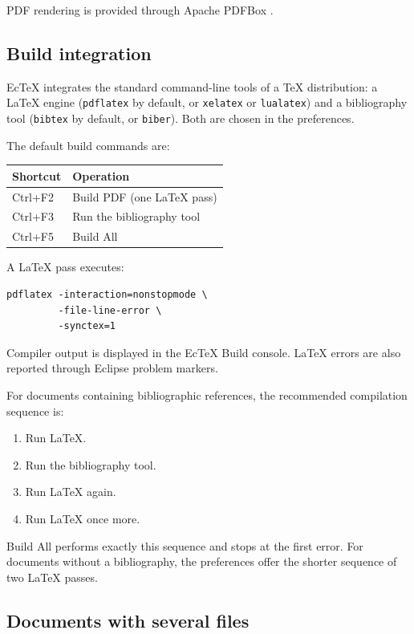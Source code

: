 PDF rendering is provided through Apache PDFBox
\cite{pdfbox}.

\subsection{Build integration}

EcTeX integrates the standard command-line tools of a TeX
distribution: a LaTeX engine (\texttt{pdflatex} by default, or
\texttt{xelatex} or \texttt{lualatex}) and a bibliography tool
(\texttt{bibtex} by default, or \texttt{biber}). Both are chosen
in the preferences.

The default build commands are:

\begin{center}
\begin{tabular}{ll}
\toprule
\textbf{Shortcut} & \textbf{Operation} \\
\midrule
Ctrl+F2 & Build PDF (one LaTeX pass) \\
Ctrl+F3 & Run the bibliography tool \\
Ctrl+F5 & Build All \\
\bottomrule
\end{tabular}
\end{center}

A LaTeX pass executes:

\begin{lstlisting}
pdflatex -interaction=nonstopmode \
         -file-line-error \
         -synctex=1
\end{lstlisting}

Compiler output is displayed in the EcTeX Build console.
LaTeX errors are also reported through Eclipse problem
markers.

For documents containing bibliographic references,
the recommended compilation sequence is:

\begin{enumerate}[noitemsep]
    \item Run LaTeX.
    \item Run the bibliography tool.
    \item Run LaTeX again.
    \item Run LaTeX once more.
\end{enumerate}

Build All performs exactly this sequence and stops at the
first error. For documents without a bibliography, the
preferences offer the shorter sequence of two LaTeX passes.

\subsection{Documents with several files}

